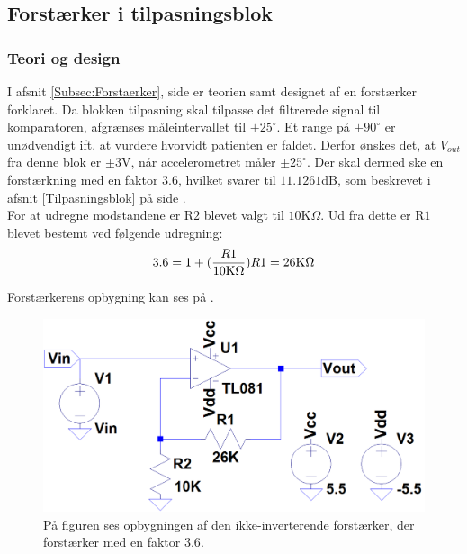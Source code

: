 \subsection{Forstærker i tilpasningsblok}
\subsubsection{Teori og design}
I afsnit \ref{Subsec:Forstaerker}, side \pageref{Subsec:Forstaerker} er teorien samt designet af en forstærker forklaret. Da blokken tilpasning skal tilpasse det filtrerede signal til komparatoren, afgrænses måleintervallet til $\pm25^{\circ}$. Et range på $\pm90^{\circ}$ er unødvendigt ift. at vurdere hvorvidt patienten er faldet. Derfor ønskes det, at $V_{out}$ fra denne blok er $\pm3$V, når accelerometret måler $\pm25^{\circ}$. Der skal dermed ske en forstærkning med en faktor $3.6$, hvilket svarer til $11.1261$dB, som beskrevet i afsnit \ref{Tilpasningsblok} på side \pageref{Tilpasningsblok}. \\
For at udregne modstandene er R$2$ blevet valgt til $10$K$\Omega$. Ud fra dette er R$1$ blevet bestemt ved følgende udregning:
\begin{equation}
3.6 = 1 + (\frac{R1}{10\text{K}\Omega}) \\
R1 = 26\text{K}\Omega
\end{equation}

\noindent Forstærkerens opbygning kan ses på .
\begin{figure}[H]
	\centering
	\includegraphics[scale=0.3]{figures/cProblemloesning/Forstaerker_faktor3.PNG}
	\caption{På figuren ses opbygningen af den ikke-inverterende forstærker, der forstærker med en faktor $3.6$.}
	\label{fig:Forstaerker_faktor3}
\end{figure}

